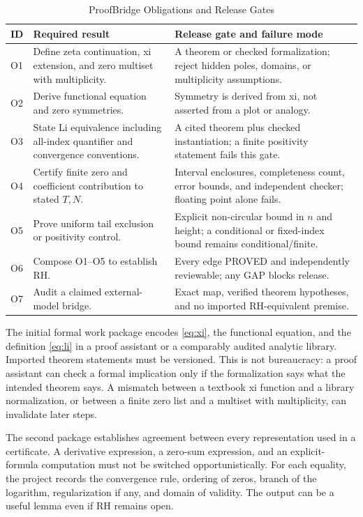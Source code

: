 \documentclass[conference]{../../../../Conference-LaTeX-template_10-17-19/IEEEtran}
\begin{document}
\begin{table}[t]
\caption{ProofBridge Obligations and Release Gates}
\centering\small
\begin{tabularx}{\textwidth}{p{}Y Y}
\toprule
ID & Required result & Release gate and failure mode\\
\midrule
O1 & Define zeta continuation, xi extension, and zero multiset with multiplicity. & A theorem or checked formalization; reject hidden poles, domains, or multiplicity assumptions.\\
O2 & Derive functional equation and zero symmetries. & Symmetry is derived from xi, not asserted from a plot or analogy.\\
O3 & State Li equivalence including all-index quantifier and convergence conventions. & A cited theorem plus checked instantiation; a finite positivity statement fails this gate.\\
O4 & Certify finite zero and coefficient contribution to stated $T,N$. & Interval enclosures, completeness count, error bounds, and independent checker; floating point alone fails.\\
O5 & Prove uniform tail exclusion or positivity control. & Explicit non-circular bound in $n$ and height; a conditional or fixed-index bound remains conditional/finite.\\
O6 & Compose O1--O5 to establish RH. & Every edge PROVED and independently reviewable; any GAP blocks release.\\
O7 & Audit a claimed external-model bridge. & Exact map, verified theorem hypotheses, and no imported RH-equivalent premise.\\
\bottomrule
\end{tabularx}
\end{table}

The initial formal work package encodes \eqref{eq:xi}, the functional equation, and the definition \eqref{eq:li} in a proof assistant or a comparably audited analytic library. Imported theorem statements must be versioned. This is not bureaucracy: a proof assistant can check a formal implication only if the formalization says what the intended theorem says. A mismatch between a textbook xi function and a library normalization, or between a finite zero list and a multiset with multiplicity, can invalidate later steps.

The second package establishes agreement between every representation used in a certificate. A derivative expression, a zero-sum expression, and an explicit-formula computation must not be switched opportunistically. For each equality, the project records the convergence rule, ordering of zeros, branch of the logarithm, regularization if any, and domain of validity. The output can be a useful lemma even if RH remains open.
\end{document}

